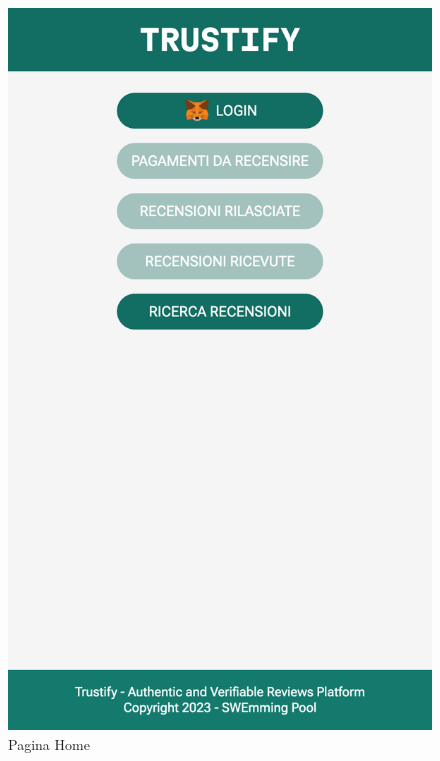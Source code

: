 \begin{figure}[H]
      \includegraphics[width=\linewidth]{src/img/home.png}
      \caption{Pagina Home}\label{fig:home}
    \endminipage\hfill

\end{figure}

